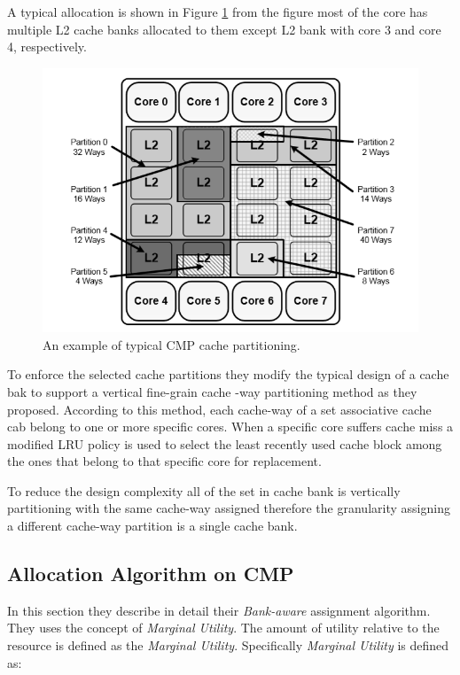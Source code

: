 \documentclass{report}
\begin{document}
\vspace{.8cm}
A typical allocation is shown in Figure \ref{fig22} from the figure most of the core has multiple L2 cache banks allocated to them except L2 bank with core 3 and core 4, respectively.

\begin{figure}[h!]
\includegraphics[width=1\textwidth]{./fig22}
\caption{ An example of typical CMP cache partitioning.}
\label{fig22}
\end{figure}


To enforce the selected cache partitions they modify the typical design of a cache bak to support a vertical fine-grain cache -way partitioning method as they proposed. According to this method, each cache-way of a set associative cache cab belong to one or more specific cores. When a specific core suffers cache miss a modified LRU policy is used to select the least recently used cache block among the ones that belong to that specific core for replacement.\vspace{.8cm}

To reduce the design complexity all of the set in cache bank is vertically partitioning with the same cache-way assigned therefore the granularity  assigning a different cache-way partition is a single cache bank.

\subsection{Allocation Algorithm on CMP}

In this section they describe in detail their \emph{Bank-aware} assignment algorithm. They uses the concept of \emph{Marginal Utility}. The amount of utility relative to the resource is defined as the \emph{Marginal Utility}. Specifically \emph{Marginal Utility} is defined as:\vspace{.8cm}
 
\end{document}
